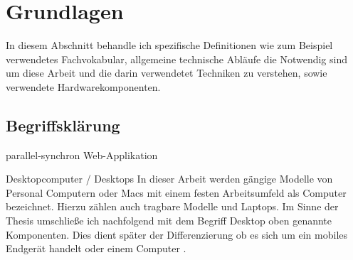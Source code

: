\chapter{Grundlagen}
In diesem Abschnitt behandle ich spezifische Definitionen wie zum Beispiel verwendetes Fachvokabular, allgemeine technische Abläufe die Notwendig sind um diese Arbeit und die darin verwendetet Techniken zu verstehen, sowie verwendete Hardwarekomponenten.

	\section{Begriffsklärung}	
		\Gls{parallel-synchron}
		\Gls{Web-Applikation}

		\Gls{Desktopcomputer / Desktops}
		In dieser Arbeit werden gängige Modelle von Personal Computern oder Macs mit einem festen Arbeitsumfeld als Computer 		bezeichnet. Hierzu zählen auch tragbare Modelle und Laptops. Im Sinne der Thesis umschließe ich nachfolgend mit dem 		Begriff Desktop oben genannte Komponenten. Dies dient später der Differenzierung ob es sich um ein mobiles Endgerät 			handelt oder einem Computer .

